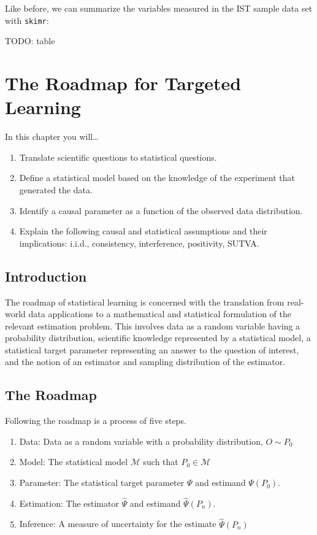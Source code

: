 \documentclass[
  12pt, krantz2,
]{krantz}
\newcommand{\passthrough}[1]{#1}
\providecommand{\tightlist}{%
  \setlength{\itemsep}{0pt}\setlength{\parskip}{0pt}}
\theoremstyle{definition}
\theoremstyle{definition}
\theoremstyle{definition}
\newcommand{\1}{\mathbbm{1}}
\begin{document}
Like before, we can summarize the variables measured in the IST sample data set with \passthrough{\lstinline!skimr!}:

TODO: table

\hypertarget{roadmap}{%
\chapter{The Roadmap for Targeted Learning}\label{roadmap}}

In this chapter you will\ldots{}

\begin{enumerate}
\def\labelenumi{\arabic{enumi}.}
\tightlist
\item
  Translate scientific questions to statistical questions.
\item
  Define a statistical model based on the knowledge of the experiment that generated the data.
\item
  Identify a causal parameter as a function of the observed data distribution.
\item
  Explain the following causal and statistical assumptions and their implications: i.i.d., consistency, interference, positivity, SUTVA.
\end{enumerate}

\hypertarget{introduction}{%
\section{Introduction}\label{introduction}}

The roadmap of statistical learning is concerned with the translation from real-world data applications to a mathematical and statistical formulation of the relevant estimation problem. This involves data as a random variable having a probability distribution, scientific knowledge represented by a statistical model, a statistical target parameter representing an answer to the question of interest, and the notion of an estimator and sampling distribution of the estimator.

\hypertarget{the-roadmap}{%
\section{The Roadmap}\label{the-roadmap}}

Following the roadmap is a process of five steps.

\begin{enumerate}
\def\labelenumi{\arabic{enumi}.}
\tightlist
\item
  Data: Data as a random variable with a probability distribution, \(O\sim P_0\)
\item
  Model: The statistical model \(\mathcal{M}\) such that \(P_0 \in \mathcal{M}\)
\item
  Parameter: The statistical target parameter \(\Psi\) and estimand \(\Psi(P_0)\).
\item
  Estimation: The estimator \(\hat{\Psi}\) and estimand \(\hat{\Psi}(P_n)\).
\item
  Inference: A measure of uncertainty for the estimate \(\hat{\Psi}(P_n)\)
\end{enumerate}
\end{document}
